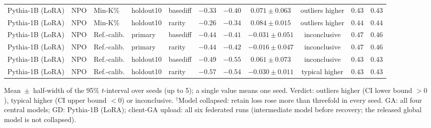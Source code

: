 {\begin{longtable}{@{\extracolsep{\fill}}lllllcccccc@{}}
Pythia-1B (LoRA) & NPO & Min-K\% & holdout10 & basediff & $-0.33$ & $-0.40$ & $0.071 \pm 0.063$ & outliers higher & $0.43$ & $0.43$ \\
Pythia-1B (LoRA) & NPO & Min-K\% & holdout10 & rarity & $-0.26$ & $-0.34$ & $0.084 \pm 0.015$ & outliers higher & $0.44$ & $0.44$ \\
Pythia-1B (LoRA) & NPO & Ref.-calib. & primary & basediff & $-0.44$ & $-0.41$ & $-0.031 \pm 0.051$ & inconclusive & $0.47$ & $0.46$ \\
Pythia-1B (LoRA) & NPO & Ref.-calib. & primary & rarity & $-0.44$ & $-0.42$ & $-0.016 \pm 0.047$ & inconclusive & $0.47$ & $0.46$ \\
Pythia-1B (LoRA) & NPO & Ref.-calib. & holdout10 & basediff & $-0.49$ & $-0.55$ & $0.061 \pm 0.073$ & inconclusive & $0.43$ & $0.43$ \\
Pythia-1B (LoRA) & NPO & Ref.-calib. & holdout10 & rarity & $-0.57$ & $-0.54$ & $-0.030 \pm 0.011$ & typical higher & $0.43$ & $0.43$ \\
\end{longtable}
Mean~$\pm$~half-width of the 95\% $t$-interval over seeds (up to 5); a single value means one seed. Verdict: outliers higher (CI lower bound $>0$), typical higher (CI upper bound $<0$) or inconclusive. $^{\dagger}$Model collapsed: retain loss rose more than threefold in every seed. GA: all four central models; GD: Pythia-1B (LoRA); client-GA upload: all six federated runs (intermediate model before recovery; the released global model is not collapsed).\par
}
